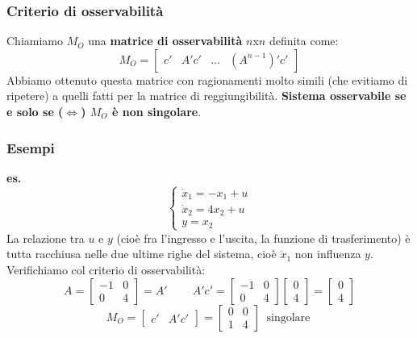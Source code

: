 \subsubsection{Criterio di osservabilità}
Chiamiamo $M_O$ una \textbf{matrice di osservabilità} $n$x$n$ definita come:
\[
    M_O = \left[\begin{matrix}
        c' & A'c' & \dots & (A^{n-1})' c'
    \end{matrix}\right]
\]
Abbiamo ottenuto questa matrice con ragionamenti molto simili (che evitiamo di ripetere) a quelli fatti per la matrice di reggiungibilità.\newline
\newline
\textbf{Sistema osservabile se e solo se ($\Leftrightarrow$) $M_O$ è non singolare}.
\subsubsection{Esempi}
\textbf{es.} 
\[
    \begin{cases}
        \dot{x}_1 = -x_1 + u \\
        \dot{x}_2 = 4x_2 +u\\
        y=x_2
    \end{cases}
\]
La relazione tra $u$ e $y$ (cioè fra l'ingresso e l'uscita, la funzione di trasferimento) è tutta racchiusa nelle due ultime righe del sistema, cioè $\dot{x}_1$ non influenza $y$.\newline
Verifichiamo col criterio di osservabilità:\newline
\[
    A= \left[\begin{matrix}
        -1 & 0 \\ 0 & 4
    \end{matrix}\right] = A' \;\;\;\;\;\;\;\; A'c' = \left[\begin{matrix}
        -1 &0 \\ 0 & 4
    \end{matrix}\right] \left[\begin{matrix}
        0 \\ 4
    \end{matrix}\right] = \left[\begin{matrix}
        0 \\ 4
    \end{matrix}\right]
\]
\[
    M_O = \left[\begin{matrix}
        c' & A' c'
    \end{matrix}\right] = \left[\begin{matrix}
        0 & 0 \\ 1 & 4
    \end{matrix}\right] \;\;\text{singolare}\;
\]
